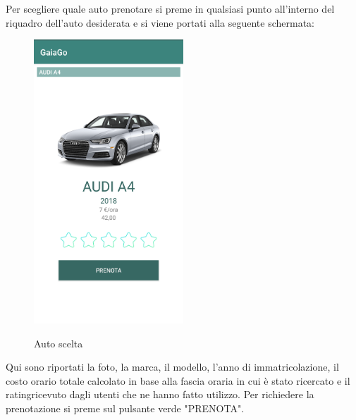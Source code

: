 \pagebreak

Per scegliere quale auto prenotare si preme in qualsiasi punto all'interno del riquadro dell'auto desiderata e si viene portati alla seguente schermata:
  \begin{figure}[H] 
	\centering 
	\includegraphics[width=0.5\textwidth]{res/images/prenotazione1.png}\\
	\caption{Auto scelta}
	\label{scelta}
\end{figure}
Qui sono riportati la foto, la marca, il modello, l'anno di immatricolazione, il costo orario totale calcolato in base alla fascia oraria in cui è stato ricercato e il rating\glosp ricevuto dagli utenti che ne hanno fatto utilizzo. Per richiedere la prenotazione si preme sul pulsante verde "PRENOTA".
\pagebreak

